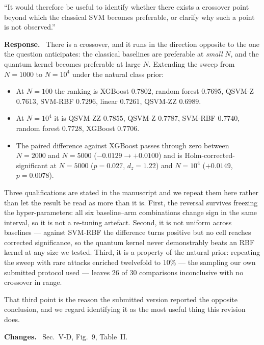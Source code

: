 \documentclass[11pt,a4paper]{article}
\newenvironment{revcomment}
  {\par\addvspace{6pt}\begingroup
   \color{quotegray}\itshape\small
   \begin{list}{}{%
     \setlength{\leftmargin}{1.8em}\setlength{\rightmargin}{1.0em}%
     \setlength{\topsep}{0pt}\setlength{\partopsep}{0pt}%
     \setlength{\parsep}{3pt}\setlength{\itemsep}{0pt}}%
   \item[]}
  {\end{list}\endgroup\normalcolor\addvspace{6pt}}
\newcommand{\itemhead}[2]{%
  \par\addvspace{15pt}%
  \noindent{\bfseries\color{tagink}#1}\hspace{0.7em}{\bfseries #2}%
  \par\addvspace{3.5pt}%
  \noindent{\color{rulegray}\rule{\linewidth}{0.5pt}}%
  \par\addvspace{5pt}%
  \nobreak}
\newcommand{\resp}{\par\addvspace{2pt}\noindent\textbf{Response.}\ }
\newcommand{\changed}{\par\addvspace{5pt}\noindent
  {\bfseries\color{tagink}Changes.}\ }
\begin{document}
\itemhead{R1-7}{Is there a crossover point beyond which the classical SVM
becomes preferable?}
\begin{revcomment}
``It would therefore be useful to identify whether there exists a crossover
point beyond which the classical SVM becomes preferable, or clarify why such a
point is not observed.''
\end{revcomment}
\resp
There is a crossover, and it runs in the direction opposite to the one the
question anticipates: the classical baselines are preferable at \emph{small}
$N$, and the quantum kernel becomes preferable at large $N$. Extending the sweep
from $N=1000$ to $N=10^{4}$ under the natural class prior:

\begin{itemize}[leftmargin=1.3em,itemsep=1pt,topsep=3pt]
  \item At $N=100$ the ranking is XGBoost $0.7802$, random forest $0.7695$,
    QSVM-Z $0.7613$, SVM-RBF $0.7296$, linear $0.7261$, QSVM-ZZ $0.6989$.
  \item At $N=10^{4}$ it is QSVM-ZZ $0.7855$, QSVM-Z $0.7787$, SVM-RBF $0.7740$,
    random forest $0.7728$, XGBoost $0.7706$.
  \item The paired difference against XGBoost passes through zero between
    $N=2000$ and $N=5000$ ($-0.0129 \rightarrow +0.0100$) and is
    Holm-corrected-significant at $N=5000$ ($p=0.027$, $d_z=1.22$) and $N=10^{4}$
    ($+0.0149$, $p=0.0078$).
\end{itemize}

Three qualifications are stated in the manuscript and we repeat them here rather
than let the result be read as more than it is. First, the reversal survives
freezing the hyper-parameters: all six baseline--arm combinations change sign in
the same interval, so it is not a re-tuning artefact. Second, it is not uniform
across baselines --- against SVM-RBF the difference turns positive but no cell
reaches corrected significance, so the quantum kernel never demonstrably beats
an RBF kernel at any size we tested. Third, it is a property of the natural
prior: repeating the sweep with rare attacks enriched twelvefold to $10\%$ ---
the sampling our own submitted protocol used --- leaves $26$ of $30$ comparisons
inconclusive with no crossover in range.

That third point is the reason the submitted version reported the opposite
conclusion, and we regard identifying it as the most useful thing this revision
does.
\changed
Sec.~V-D, Fig.~9, Table~II.
\end{document}
